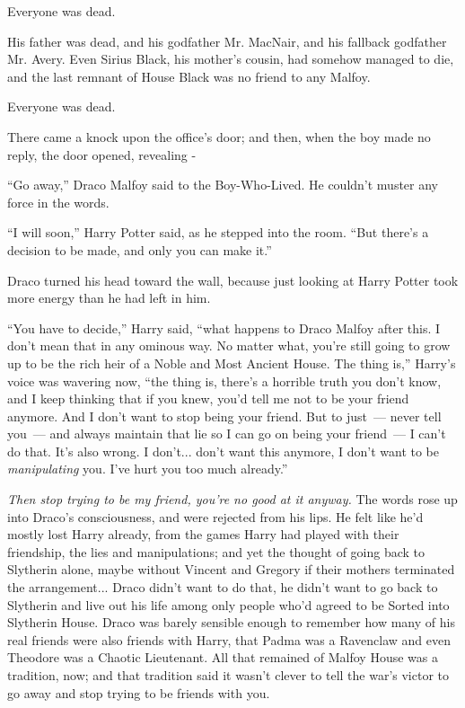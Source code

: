 Everyone was dead.

His father was dead, and his godfather Mr. MacNair, and his fallback godfather Mr. Avery. Even Sirius Black, his mother's cousin, had somehow managed to die, and the last remnant of House Black was no friend to any Malfoy.

Everyone was dead.

There came a knock upon the office's door; and then, when the boy made no reply, the door opened, revealing -

``Go away,'' Draco Malfoy said to the Boy-Who-Lived. He couldn't muster any force in the words.

``I will soon,'' Harry Potter said, as he stepped into the room. ``But there's a decision to be made, and only you can make it.''

Draco turned his head toward the wall, because just looking at Harry Potter took more energy than he had left in him.

``You have to decide,'' Harry said, ``what happens to Draco Malfoy after this. I don't mean that in any ominous way. No matter what, you're still going to grow up to be the rich heir of a Noble and Most Ancient House. The thing is,'' Harry's voice was wavering now, ``the thing is, there's a horrible truth you don't know, and I keep thinking that if you knew, you'd tell me not to be your friend anymore. And I don't want to stop being your friend. But to just~--- never tell you~--- and always maintain that lie so I can go on being your friend~--- I can't do that. It's also wrong. I don't... don't want this anymore, I don't want to be \emph{manipulating} you. I've hurt you too much already.''

\emph{Then stop trying to be my friend, you're no good at it anyway.} The words rose up into Draco's consciousness, and were rejected from his lips. He felt like he'd mostly lost Harry already, from the games Harry had played with their friendship, the lies and manipulations; and yet the thought of going back to Slytherin alone, maybe without Vincent and Gregory if their mothers terminated the arrangement... Draco didn't want to do that, he didn't want to go back to Slytherin and live out his life among only people who'd agreed to be Sorted into Slytherin House. Draco was barely sensible enough to remember how many of his real friends were also friends with Harry, that Padma was a Ravenclaw and even Theodore was a Chaotic Lieutenant. All that remained of Malfoy House was a tradition, now; and that tradition said it wasn't clever to tell the war's victor to go away and stop trying to be friends with you.

